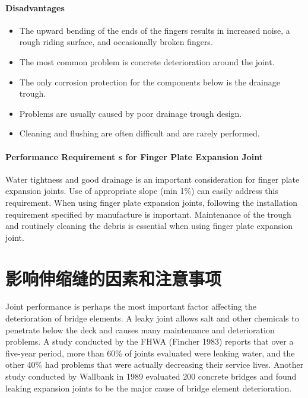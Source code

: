 \paragraph{Disadvantages}
\begin{itemize}
  \item The upward bending of the ends of the fingers results in increased noise, a rough riding surface, and
  occasionally broken fingers.
  \item  The most common problem is concrete deterioration around the joint.
  \item The only corrosion protection for the components below is the drainage trough.
  \item  Problems are usually caused by poor drainage trough design.
  \item Cleaning and flushing are often difficult and are rarely performed.
\end{itemize}

\paragraph{Performance Requirement s for Finger Plate Expansion Joint}

Water tightness and good drainage is an important consideration for finger plate expansion joints. Use of
appropriate slope (min 1\%) can easily address this requirement. When using finger plate expansion joints, following
the installation requirement specified by manufacture is important. Maintenance of the trough and routinely cleaning
the debris is essential when using finger plate expansion joint.


\section{影响伸缩缝的因素和注意事项}
\label{sec:factors-joints-life}
Joint performance is perhaps the most important factor affecting the deterioration of bridge elements. A leaky
joint allows salt and other chemicals to penetrate below the deck and causes many maintenance and deterioration
problems. A study conducted by the FHWA (Fincher 1983) reports that over a five-year period, more than 60\% of
joints evaluated were leaking water, and the other 40\% had problems that were actually decreasing their service lives.
Another study conducted by Wallbank in 1989 evaluated 200 concrete bridges and found leaking expansion joints to
be the major cause of bridge element deterioration.

